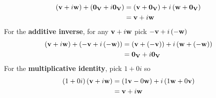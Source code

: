 \begin{solution}
  \begin{align*}
    \left( \vb{v} + i\vb{w} \right) + \left( \vb{0}_{\mathbf{V}} + i \vb{0}_{\mathbf{V}} \right) & = \left( \vb{v} + \vb{0}_{\mathbf{V}} \right) + i\left( \vb{w} + \vb{0}_{\mathbf{V}} \right) \\
    &= \vb{v} + i\vb{w}
  \end{align*}
  For the \textbf{additive inverse}, for any \( \vb{v}+ i \vb{w} \)  pick \( -\vb{v} + i \left( -\vb{w} \right) \) 
  \begin{align*}
    \left( \vb{v}+ i \vb{w} \right) + \left( -\vb{v} + i \left( -\vb{w} \right) \right) &= \left( \vb{v} + \left( -\vb{v} \right) \right) + i \left( \vb{w} + \left( -\vb{w} \right) \right) \\
    &= \vb{0}_{\mathbf{V}} + i \vb{0}_{\mathbf{V}}
  \end{align*}
  For the \textbf{multiplicative identity}, pick \( 1 + 0i \)  so 
  \begin{align*}
    \left( 1 + 0i \right) \left( \vb{v} + i\vb{w} \right) &= \left( 1 \vb{v} - 0 \vb{w} \right) + i \left( 1 \vb{w} + 0\vb{v} \right) \\
    &= \vb{v} + i \vb{w}
  \end{align*}
  
\end{solution}



